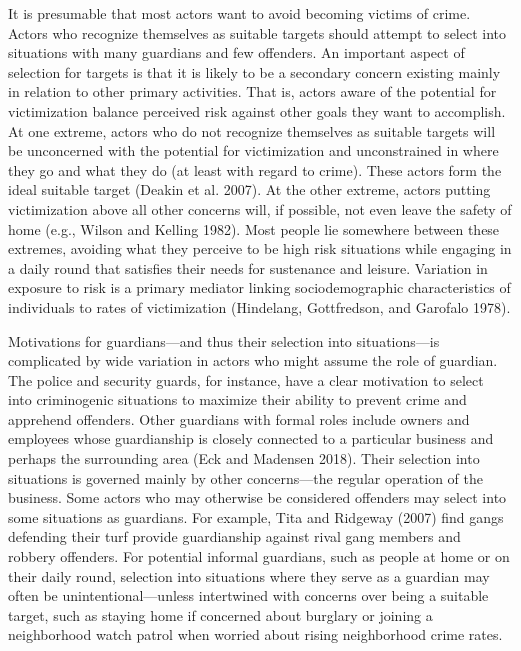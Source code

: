 \documentclass [11pt, proquest] {uwthesis}[2015/03/03]
\begin{document}
It is presumable that most actors want to avoid becoming victims of crime. Actors who recognize themselves as suitable targets should attempt to select into situations with many guardians and few offenders. An important aspect of selection for targets is that it is likely to be a secondary concern existing mainly in relation to other primary activities. That is, actors aware of the potential for victimization balance perceived risk against other goals they want to accomplish. At one extreme, actors who do not recognize themselves as suitable targets will be unconcerned with the potential for victimization and unconstrained in where they go and what they do (at least with regard to crime). These actors form the ideal suitable target (Deakin et al. 2007). At the other extreme, actors putting victimization above all other concerns will, if possible, not even leave the safety of home (e.g., Wilson and Kelling 1982). Most people lie somewhere between these extremes, avoiding what they perceive to be high risk situations while engaging in a daily round that satisfies their needs for sustenance and leisure. Variation in exposure to risk is a primary mediator linking sociodemographic characteristics of individuals to rates of victimization (Hindelang, Gottfredson, and Garofalo 1978).

Motivations for guardians---and thus their selection into situations---is complicated by wide variation in actors who might assume the role of guardian. The police and security guards, for instance, have a clear motivation to select into criminogenic situations to maximize their ability to prevent crime and apprehend offenders. Other guardians with formal roles include owners and employees whose guardianship is closely connected to a particular business and perhaps the surrounding area (Eck and Madensen 2018). Their selection into situations is governed mainly by other concerns---the regular operation of the business. Some actors who may otherwise be considered offenders may select into some situations as guardians. For example, Tita and Ridgeway (2007) find gangs defending their turf provide guardianship against rival gang members and robbery offenders. For potential informal guardians, such as people at home or on their daily round, selection into situations where they serve as a guardian may often be unintentional---unless intertwined with concerns over being a suitable target, such as staying home if concerned about burglary or joining a neighborhood watch patrol when worried about rising neighborhood crime rates.
\end{document}
